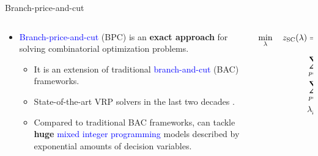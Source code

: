 \begin{frame}{Branch-price-and-cut}
	\begin{columns}
		\begin{column}{.7\textwidth}
			\begin{itemize}[<+->]
				\item \textcolor{blue}{Branch-price-and-cut} (BPC) is an \textbf{exact approach} for solving combinatorial optimization problems.
				      \begin{itemize}
					      \item It is an extension of traditional \textcolor{blue}{branch-and-cut} (BAC) frameworks.
					      \item State-of-the-art VRP solvers in the last two decades \parencite{fukasawa2006, pessoa2008, gutierrez-jarpa2010, archetti2011, bettinelli2011, contardo2014, contardo2015, pecin2017new, pecin2017improved, pessoa2020generic}.
					            \pause[\thebeamerpauses]
					      \item Compared to traditional BAC frameworks, can tackle \textbf{huge} \textcolor{blue}{mixed integer programming} models described by exponential amounts of decision variables.
				      \end{itemize}
			\end{itemize}
		\end{column}
		\begin{column}{.3\textwidth}
			{
				\fontsize{9.5pt}{9.5pt}\selectfont

				\begin{align*}
					\min_{\lambda} \quad z_\mt{SC}(\lambda) & = \sum_{p \in P}  c_p \lambda_p                                      \\
					                                        & \sum_{p \in P} \lambda_{p} = K                                       \\
					                                        & \sum_{p \in P}  a_{ip} \lambda_p \ge 1       \quad \forall i \in V_0 \\
					                                        & \lambda_p                    \in \Set*{0, 1} \quad \forall p \in P.
				\end{align*}
			}
		\end{column}
	\end{columns}

	\pause[\thebeamerpauses]


\end{frame}

